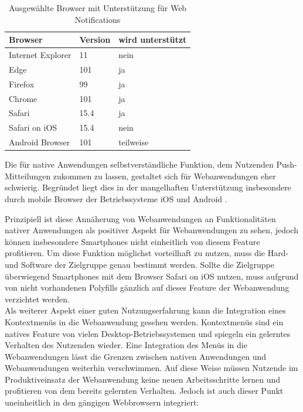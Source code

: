 \documentclass[a4paper]{scrartcl}
\begin{document}
\begin{table}[H]
 	\caption{Ausgewählte Browser mit Unterstützung für Web Notifications}
 	\begin{center}
 		\begin{tabularx}{\linewidth}{| Y | Y | Y |}
 			\hline
 			\textbf{Browser} & \textbf{Version} & \textbf{wird unterstützt} \\
 			\hline \hline
 			Internet Explorer & 11 & nein \\
 			\hline
 			Edge & 101 & ja \\
 			\hline
 			Firefox & 99 & ja \\
 			\hline
 			Chrome & 101 & ja \\
 			\hline
 			Safari & 15.4 & ja \\
 			\hline
 			Safari on iOS & 15.4 & nein \\
 			\hline
 			Android Browser & 101 & teilweise \\
 			\hline
 		\end{tabularx}
 	\end{center}
 	\justifying
	\small	
 	Die für native Anwendungen selbstverständliche Funktion, dem Nutzenden Push-Mitteilungen zukommen zu lassen, gestaltet sich für Webanwendungen eher schwierig. Begründet liegt dies in der mangelhaften Unterstützung insbesondere durch mobile Browser der Betriebssysteme iOS und Android \autocite{Web_Notifications}. 
 \end{table}

Prinzipiell ist diese Annäherung von Webanwendungen an Funktionalitäten nativer Anwendungen als positiver Aspekt für Webanwendungen zu sehen, jedoch können insbesondere Smartphones nicht einheitlich von diesem Feature profitieren. Um diese Funktion möglichst vorteilhaft zu nutzen, muss die Hard- und Software der Zielgruppe genau bestimmt werden. Sollte die Zielgruppe überwiegend Smartphones mit dem Browser Safari on iOS nutzen, muss aufgrund von nicht vorhandenen Polyfills gänzlich auf dieses Feature der Webanwendung verzichtet werden. \\

Als weiterer Aspekt einer guten Nutzungserfahrung kann die Integration eines Kontextmenüs in die Webanwendung gesehen werden. Kontextmenüs sind ein natives Feature von vielen Desktop-Betriebssystemen und spiegeln ein gelerntes Verhalten des Nutzenden wieder. Eine Integration des Menüs in die Webanwendungen lässt die Grenzen zwischen nativen Anwendungen und Webanwendungen weiterhin verschwimmen. Auf diese Weise müssen Nutzende im Produktiveinsatz der Webanwendung keine neuen Arbeitsschritte lernen und profitieren von dem bereits gelernten Verhalten. Jedoch ist auch dieser Punkt uneinheitlich in den gängigen Webbrowsern integriert:
\end{document}
